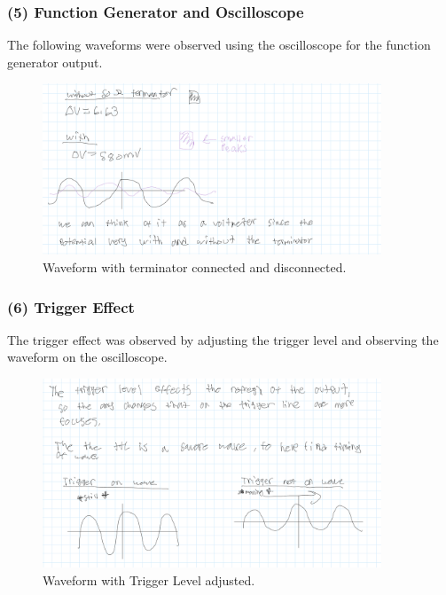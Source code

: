 \documentclass{article}
\begin{document}
    \subsubsection{(5) Function Generator and Oscilloscope}
    The following waveforms were observed using the oscilloscope for the function generator output.

    \begin{figure}[H]
        \centering
        \includegraphics[width=0.9\textwidth]{img/Lab1_5.png}  %
        \caption{Waveform with terminator connected and disconnected.}
        \label{fig:terminated_waveform}
    \end{figure}

    \subsubsection{(6) Trigger Effect}
    The trigger effect was observed by adjusting the trigger level and observing the waveform on the oscilloscope. 
    
    \begin{figure}[H]
        \centering
        \includegraphics[width=0.9\textwidth]{img/Lab1_6.png}  
        \caption{Waveform with Trigger Level adjusted.}
        \label{fig:trigger_waveform}
    \end{figure}
\end{document}
